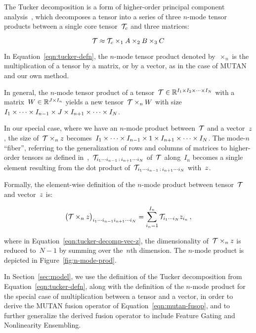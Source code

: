 The Tucker decomposition is a form of higher-order principal component
analysis~\citep{kolda2009tensor}, which decomposes a tensor into a series of
three $n$-mode tensor products between a single core tensor~$\mathcal{T}_c$ and three
matrices:

\begin{equation}
        \mathcal{T} \approx \mathcal{T}_c \times_1 A \times_2 B \times_3 C
\label{eqn:tucker-defn}
\end{equation}

In Equation~\ref{eqn:tucker-defn}, the $n$-mode tensor product denoted
by~$\times_n$ is the multiplication of a tensor by a matrix, or by a vector, as
in the case of MUTAN and our own method.

In general, the $n$-mode tensor product of a
tensor~$\mathcal{T} \in \mathbb{R}^{I_1 \times I_2 \times \cdots \times I_N}$ with a
matrix~$W \in \mathbb{R}^{J \times I_n}$ yields a new tensor~$\mathcal{T} \times_n W$ with
size~$I_1 \times \cdots \times I_{n - 1} \times J \times I_{n + 1} \times \cdots \times I_N$.

In our special case, where we have an $n$-mode product between~$\mathcal{T}$ and a
vector~$z$, the size of~$\mathcal{T} \times_n z$ becomes~$I_1 \times \cdots \times I_{n - 1} \times 1 \times I_{n + 1} \times \cdots \times I_N$. The mode-$n$
``fiber'', referring to the generalization of rows and columns of matrices to
higher-order tensors as defined in~\citet{kolda2009tensor},~$\mathcal{T}_{i_1 \cdots i_{n - 1} \,:\, i_{n + 1} \cdots i_N}$ of~$\mathcal{T}$
along~$I_n$ becomes a single element resulting from the dot product
of~$\mathcal{T}_{i_1 \cdots i_{n - 1} \,:\, i_{n + 1} \cdots i_N}$ with~$z$.

Formally, the element-wise definition of the $n$-mode product between
tensor~$\mathcal{T}$ and vector~$z$ is:

\begin{equation}
        {\big(\ensuremath{\mathcal{T}}\times_n \ensuremath{z}\big)}_{i_1 \cdots i_{n - 1} i_{n + 1} \cdots i_N} = \sum_{i_n = 1}^{I_n} \mathcal{T}_{i_1 \cdots i_N} z_{i_n} \,,
\label{eqn:tucker-decomp-vec-z}
\end{equation}

\noindent where in Equation~\ref{eqn:tucker-decomp-vec-z}, the dimensionality
of~$\mathcal{T} \times_n z$ is reduced to~$N - 1$ by summing over the~$n$th dimension.
The $n$-mode product is depicted in Figure~\ref{fig:n-mode-prod}.

In Section~\ref{sec:model}, we use the definition of the Tucker decomposition
from Equation~\ref{eqn:tucker-defn}, along with the definition of the $n$-mode
product for the special case of multiplication between a tensor and a vector,
in order to derive the MUTAN fusion operator of Equation~\ref{eqn:mutan-fusop},
and to further generalize the derived fusion operator to include Feature Gating
and Nonlinearity Ensembling.


